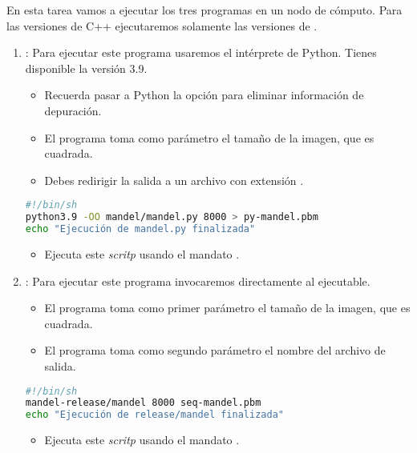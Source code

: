 En esta tarea vamos a ejecutar los tres programas en un nodo de cómputo.
Para las versiones de C++ ejecutaremos solamente las versiones de .

\begin{enumerate}
  \item {}: Para ejecutar este programa usaremos el intérprete de Python.
        Tienes disponible la versión 3.9.

    \begin{itemize}
      \item Recuerda pasar a Python la opción  para eliminar información
            de depuración.
      \item El programa toma como parámetro el tamaño de la imagen, que es cuadrada.
      \item Debes redirigir la salida a un archivo con extensión .
    \end{itemize}

\begin{lstlisting}[language=bash,title={Archivo: runpy.sh},frame=single]
#!/bin/sh
python3.9 -OO mandel/mandel.py 8000 > py-mandel.pbm
echo "Ejecución de mandel.py finalizada"
\end{lstlisting}

    \begin{itemize}
      \item Ejecuta este \emph{scritp} usando el mandato .
    \end{itemize}

  \item {}: Para ejecutar este programa invocaremos directamente al
        ejecutable.
    \begin{itemize}
      \item El programa toma como primer parámetro el tamaño de la imagen, que es cuadrada.
      \item El programa toma como segundo parámetro el nombre del archivo de salida.
    \end{itemize}

\begin{lstlisting}[language=bash,title={Archivo: run-seq-mandel.sh},frame=single]
#!/bin/sh
mandel-release/mandel 8000 seq-mandel.pbm
echo "Ejecución de release/mandel finalizada"
\end{lstlisting}
    \begin{itemize}
      \item Ejecuta este \emph{scritp} usando el mandato .
    \end{itemize}


\end{enumerate}
